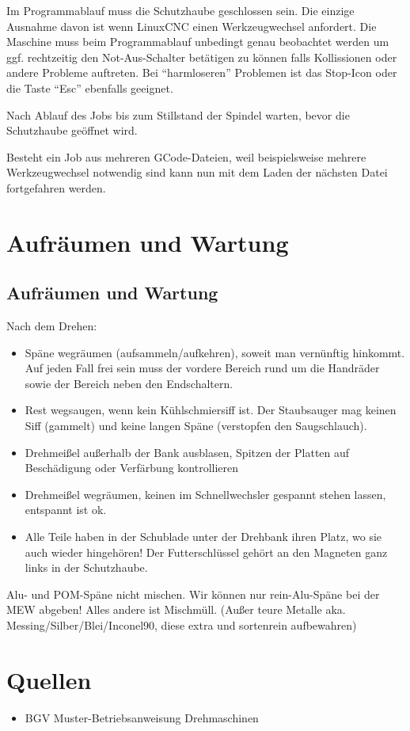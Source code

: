 \documentclass{\basedir/fablab-document}
\begin{document}
Im Programmablauf muss die Schutzhaube geschlossen sein. Die einzige Ausnahme davon ist wenn LinuxCNC einen Werkzeugwechsel anfordert. Die Maschine muss beim Programmablauf unbedingt genau beobachtet werden um ggf. rechtzeitig den Not-Aus-Schalter betätigen zu können falls Kollissionen oder andere Probleme auftreten. Bei \enquote{harmloseren} Problemen ist das Stop-Icon oder die Taste \enquote{Esc} ebenfalls geeignet.

Nach Ablauf des Jobs bis zum Stillstand der Spindel warten, bevor die Schutzhaube geöffnet wird.

Besteht ein Job aus mehreren GCode-Dateien, weil beispielsweise mehrere Werkzeugwechsel notwendig sind kann nun mit dem Laden der nächsten Datei fortgefahren werden.

\newpage
\section{Aufräumen und Wartung}


\subsection{Aufräumen und Wartung}
Nach dem Drehen:

\begin{itemize}
 \item Späne wegräumen (aufsammeln/aufkehren), soweit man vernünftig hinkommt. Auf jeden Fall frei sein muss der vordere Bereich rund um die Handräder sowie der Bereich neben den Endschaltern.
 \item Rest wegsaugen, wenn kein Kühlschmiersiff ist. Der Staubsauger mag keinen Siff (gammelt) und keine langen Späne (verstopfen den Saugschlauch).
 \item Drehmeißel außerhalb der Bank ausblasen, Spitzen der Platten auf Beschädigung oder Verfärbung kontrollieren
 \item Drehmeißel wegräumen, keinen im Schnellwechsler gespannt stehen lassen, entspannt ist ok.
 \item Alle Teile haben in der Schublade unter der Drehbank ihren Platz, wo sie auch wieder hingehören! Der Futterschlüssel gehört an den Magneten ganz links in der Schutzhaube.
\end{itemize}


Alu- und POM-Späne nicht mischen. Wir können nur rein-Alu-Späne bei der MEW abgeben! Alles andere ist Mischmüll. (Außer teure Metalle aka. Messing/Silber/Blei/Inconel90, diese extra und sortenrein aufbewahren)

\appendix

\section{Quellen}
\begin{itemize}
 \item BGV Muster-Betriebsanweisung Drehmaschinen
\end{itemize}
\end{document}
